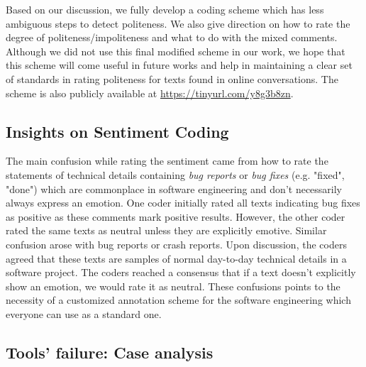 Based on our discussion, 
we fully develop a coding scheme
which has less ambiguous steps to detect politeness. 
We also give direction on 
how to rate the degree of politeness/impoliteness 
and what to do with the mixed comments. 
Although we did not use this final modified scheme in our work, 
we hope that this scheme will come useful in future works 
and help in maintaining a clear set of standards 
in rating politeness for texts found in online conversations. 
The scheme is also publicly available at \href{https://tinyurl.com/y8g3b8zn}{https://tinyurl.com/y8g3b8zn}.

\subsection{Insights on Sentiment Coding}\label{sentschemedis}
The main confusion 
while rating the sentiment
came from how to rate the statements of technical details 
containing \textit{bug reports} or \textit{bug fixes} 
(e.g. "fixed", "done") 
which are commonplace in software engineering and 
don't necessarily always express an emotion. 
One coder initially rated all texts indicating bug fixes 
as positive 
as these comments mark positive results. 
However, the other coder rated the same texts as neutral 
unless they are explicitly emotive. 
Similar confusion arose with bug reports or crash reports. 
Upon discussion, the coders agreed that 
these texts are samples of normal day-to-day technical details 
in a software project. 
The coders reached a consensus 
that if a text doesn't explicitly show an emotion, 
we would rate it as neutral. 
These confusions points 
to the necessity of a customized annotation scheme 
for the software engineering 
which everyone can use as a standard one. 

\subsection{Tools' failure: Case analysis}
 
